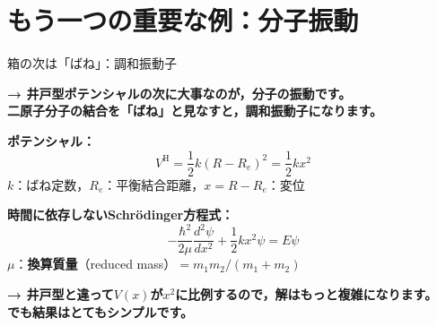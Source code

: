 \documentclass[aspectratio=169, 11pt]{beamer}
\newcommand{\teacher}[1]{{\color{darkblue}\textbf{→ #1}}}
\begin{document}
\section{もう一つの重要な例：分子振動}

\begin{frame}{箱の次は「ばね」：調和振動子}

\teacher{井戸型ポテンシャルの次に大事なのが，\textbf{分子の振動}です。\\
二原子分子の結合を「ばね」と見なすと，調和振動子になります。}

\vspace{0.3em}
\textbf{ポテンシャル：}
\[
  V^\text{H} = \frac{1}{2}k(R - R_e)^2 = \frac{1}{2}kx^2
\]
{\small $k$：ばね定数，$R_e$：平衡結合距離，$x = R - R_e$：変位}

\vspace{0.3em}
\textbf{時間に依存しないSchrödinger方程式：}
\[
  -\frac{\hbar^2}{2\mu}\frac{d^2\psi}{dx^2} + \frac{1}{2}kx^2\psi = E\psi
\]
{\small $\mu$：\textbf{換算質量}（reduced mass）$= m_1 m_2/(m_1 + m_2)$}

\vspace{0.3em}
\teacher{井戸型と違って$V(x)$が$x^2$に比例するので，解はもっと複雑になります。\\
でも結果はとてもシンプルです。}
\end{frame}
\end{document}
